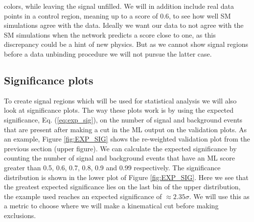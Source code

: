\documentclass[12pt, a4paper]{book}
\begin{document}
colors, while leaving the signal unfilled. We will in addition include real data points in a control region, meaning up to a score of 0.6, to see how well SM simulations agree with the data. Ideally we want our data to not agree with the SM simulations when the network 
predicts a score close to one, as this discrepancy could be a hint of new physics. But as we cannot show signal regions before a data unbinding procedure we will not pursue the latter case.


\clearpage
\subsection{Significance plots}\label{sec:siggy}
To create signal regions which will be used for statistical analysis we will also look at significance plots. The way these plots work is by using the expected significance, Eq. (\ref{eq:exp_sig}), on the number of signal and background events that are present after making a cut in the ML output on the validation plots. 
As an example, Figure \ref{fig:EXP_SIG} shows the re-weighted validation plot from the previous section (upper figure). We can calculate the expected significance by counting the number of signal and background events that have an ML score greater than 0.5, 0.6, 0.7, 0.8, 0.9 and 0.99 respectively. The significance distribution is shown in the lower plot of Figure \ref{fig:EXP_SIG}. 
Here we see that the greatest expected significance lies on the last bin of the upper distribution, the example used reaches an expected significance of $\approx 2.35\sigma$. We will use this as a metric to choose where we will make a kinematical cut before making exclusions.
\end{document}
